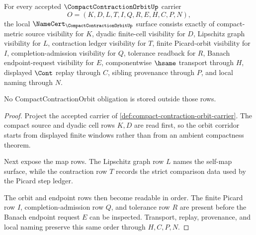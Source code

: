 \begin{theorem}
\label{thm:compact-contraction-orbit-namecert-obligations}
For every accepted $\CompactContractionOrbitUp$ carrier
$$
O=(K,D,L,T,I,Q,R,E,H,C,P,N),
$$
the local $\NameCert_{\CompactContractionOrbitUp}$ surface consists exactly of compact-metric source visibility for $K$, dyadic finite-cell visibility for $D$, Lipschitz graph visibility for $L$, contraction ledger visibility for $T$, finite Picard-orbit visibility for $I$, completion-admission visibility for $Q$, tolerance readback for $R$, Banach endpoint-request visibility for $E$, componentwise $\hsame$ transport through $H$, displayed $\Cont$ replay through $C$, sibling provenance through $P$, and local naming through $N$.

No CompactContractionOrbit obligation is stored outside those rows.
\end{theorem}
\begin{proof}
Project the accepted carrier of \autoref{def:compact-contraction-orbit-carrier}. The compact source and dyadic cell rows $K,D$ are read first, so the orbit corridor starts from displayed finite windows rather than from an ambient compactness theorem.

Next expose the map rows. The Lipschitz graph row $L$ names the self-map surface, while the contraction row $T$ records the strict comparison data used by the Picard step ledger.

The orbit and endpoint rows then become readable in order. The finite Picard row $I$, completion-admission row $Q$, and tolerance row $R$ are present before the Banach endpoint request $E$ can be inspected. Transport, replay, provenance, and local naming preserve this same order through $H,C,P,N$.
\end{proof}

